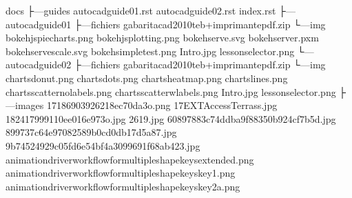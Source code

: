 \documentclass[a4paper,10pt,french]{sphinxmanual}
\begin{document}
\begin{sphinxVerbatim}[commandchars=\\\{\}]
docs
\textbar{}   
\textbar{}
├---guides
\textbar{}   \textbar{}   autocad\PYGZhy{}guide01.rst
\textbar{}   \textbar{}   autocad\PYGZhy{}guide02.rst
\textbar{}   \textbar{}   index.rst
\textbar{}   \textbar{}
\textbar{}   ├---autocad\PYGZhy{}guide01
\textbar{}   \textbar{}   ├---fichiers
\textbar{}   \textbar{}   \textbar{}       gabarit\PYGZus{}acad2010\PYGZus{}teb+imprimante\PYGZus{}pdf.zip
\textbar{}   \textbar{}   \textbar{}
\textbar{}   \textbar{}   └---img
\textbar{}   \textbar{}           bokehjs\PYGZus{}pie\PYGZus{}charts.png
\textbar{}   \textbar{}           bokehjs\PYGZus{}plotting.png
\textbar{}   \textbar{}           bokeh\PYGZus{}serve.svg
\textbar{}   \textbar{}           bokeh\PYGZus{}server.pxm
\textbar{}   \textbar{}           bokeh\PYGZus{}serve\PYGZus{}scale.svg
\textbar{}   \textbar{}           bokeh\PYGZus{}simple\PYGZus{}test.png
\textbar{}   \textbar{}           Intro.jpg
\textbar{}   \textbar{}           lesson\PYGZus{}selector.png
\textbar{}   \textbar{}
\textbar{}   └---autocad\PYGZhy{}guide02
\textbar{}       ├---fichiers
\textbar{}       \textbar{}       gabarit\PYGZus{}acad2010\PYGZus{}teb+imprimante\PYGZus{}pdf.zip
\textbar{}       \textbar{}
\textbar{}       └---img
\textbar{}               charts\PYGZus{}donut.png
\textbar{}               charts\PYGZus{}dots.png
\textbar{}               charts\PYGZus{}heatmap.png
\textbar{}               charts\PYGZus{}lines.png
\textbar{}               charts\PYGZus{}scatter\PYGZus{}no\PYGZus{}labels.png
\textbar{}               charts\PYGZus{}scatter\PYGZus{}w\PYGZus{}labels.png
\textbar{}               Intro.jpg
\textbar{}               lesson\PYGZus{}selector.png
\textbar{}
├---images
\textbar{}       17186903926\PYGZus{}218ec70da3\PYGZus{}o.png
\textbar{}       17\PYGZus{}EXT\PYGZhy{}\PYGZus{}Access\PYGZus{}Terrass.jpg
\textbar{}       18241799911\PYGZus{}0ee016e973\PYGZus{}o.jpg
\textbar{}       2619.jpg
\textbar{}       60897883c74ddba9f88350b924cf7b5d.jpg
\textbar{}       899737c64e97082589b0cd0db17d5a87.jpg
\textbar{}       9b7452\PYGZus{}4929c05fd6e54bf4a3099691f68ab423.jpg
\textbar{}       animation\PYGZus{}driver\PYGZus{}workflow\PYGZus{}for\PYGZhy{}multiple\PYGZhy{}shape\PYGZhy{}keys\PYGZhy{}extended.png
\textbar{}       animation\PYGZus{}driver\PYGZus{}workflow\PYGZus{}for\PYGZhy{}multiple\PYGZhy{}shape\PYGZhy{}keys\PYGZhy{}key1.png
\textbar{}       animation\PYGZus{}driver\PYGZus{}workflow\PYGZus{}for\PYGZhy{}multiple\PYGZhy{}shape\PYGZhy{}keys\PYGZhy{}key2a.png

\end{sphinxVerbatim}
\end{document}
